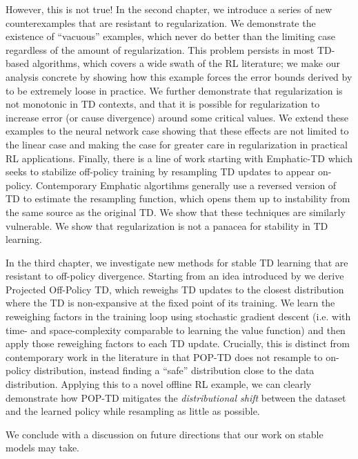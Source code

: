 \documentclass[12pt]{cmuthesis}
\begin{document}
However, this is not true! In the second chapter, we introduce a series of new counterexamples that are resistant to regularization. We demonstrate the existence of ``vacuous'' examples, which never do better than the limiting case regardless of the amount of regularization. This problem persists in most TD-based algorithms, which covers a wide swath of the RL literature; we make our analysis concrete by showing how this example forces the error bounds derived by \citet{zhang2021breaking} to be extremely loose in practice. We further demonstrate that regularization is not monotonic in TD contexts, and that it is possible for regularization to increase error (or cause divergence) around some critical values. We extend these examples to the neural network case showing that these effects are not limited to the linear case and making the case for greater care in regularization in practical RL applications. Finally, there is a line of work starting with Emphatic-TD which seeks to stabilize off-policy training by resampling TD updates to appear on-policy. Contemporary Emphatic algortihms generally use a reversed version of TD to estimate the resampling function, which opens them up to instability from the same source as the original TD. We show that these techniques are similarly vulnerable. We show that regularization is not a panacea for stability in TD learning.

In the third chapter, we investigate new methods for stable TD learning that are resistant to off-policy divergence. Starting from an idea introduced by \citet{kolter2011fixed} we derive Projected Off-Policy TD, which reweighs TD updates to the closest distribution where the TD is non-expansive at the fixed point of its training. We learn the reweighing factors in the training loop using stochastic gradient descent (i.e. with time- and space-complexity comparable to learning the value function) and then apply those reweighing factors to each TD update. Crucially, this is distinct from contemporary work in the literature in that POP-TD does not resample to on-policy distribution, instead finding a ``safe'' distribution close to the data distribution. Applying this to a novel offline RL example, we can clearly demonstrate how POP-TD mitigates the \emph{distributional shift} between the dataset and the learned policy \cite{levine2020survey} while resampling as little as possible.

We conclude with a discussion on future directions that our work on stable models may take.


\mainmatter
\end{document}
